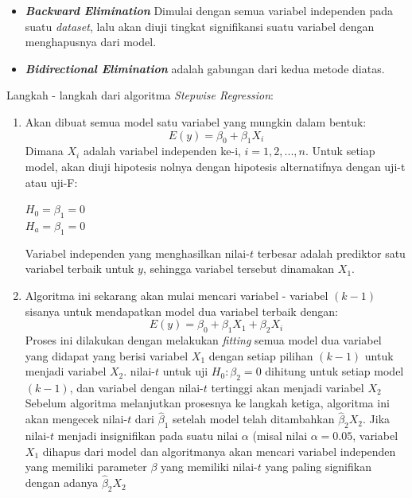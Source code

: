 \begin{enumerate}
\begin{itemize}
    \item \textit{\textbf{Backward Elimination}} Dimulai dengan semua variabel independen pada suatu \textit{dataset}, lalu akan diuji tingkat signifikansi suatu variabel dengan menghapusnya dari model.
    \item \textit{\textbf{Bidirectional Elimination}} adalah gabungan dari kedua metode diatas.
\end{itemize}
Langkah - langkah dari algoritma \textit{Stepwise Regression}:
\begin{enumerate}
    \item Akan dibuat semua model satu variabel yang mungkin dalam bentuk:
    \begin{equation*}
        E(y) = \beta_0 + \beta_1 X_i
    \end{equation*}
    Dimana $X_i$ adalah variabel independen ke-i, $i = 1, 2, ..., n$. Untuk setiap model, akan diuji hipotesis nolnya dengan hipotesis alternatifnya dengan uji-t atau uji-F:
    \begin{center}
        $H_0 = \beta_1 = 0$ \\
        $H_a = \beta_1 = 0$
    \end{center}
    Variabel independen yang menghasilkan nilai-$t$ terbesar adalah prediktor satu variabel terbaik untuk $y$, sehingga variabel tersebut dinamakan $X_1$.
    \item Algoritma ini sekarang akan mulai mencari variabel - variabel $(k - 1)$ sisanya untuk mendapatkan model dua variabel terbaik dengan:
    \begin{equation*}
        E(y) = \beta_0 + \beta_1 X_1 + \beta_2 X_i   
    \end{equation*}
    Proses ini dilakukan dengan melakukan \textit{fitting} semua model dua variabel yang didapat yang berisi variabel $X_1$ dengan setiap pilihan $(k - 1)$ untuk menjadi variabel $X_2$. nilai-$t$ untuk uji $H_0: \beta_2 = 0$ dihitung untuk setiap model $(k - 1)$, dan variabel dengan nilai-$t$ tertinggi akan menjadi variabel $X_2$ \\
    Sebelum algoritma melanjutkan prosesnya ke langkah ketiga, algoritma ini akan mengecek nilai-$t$ dari $
    \hat{\beta}_1$ setelah model telah ditambahkan $\hat{\beta}_2 X_2$. Jika nilai-$t$ menjadi insignifikan pada suatu nilai $\alpha$ (misal nilai $\alpha = 0.05$, variabel $X_1$ dihapus dari model dan algoritmanya akan mencari variabel independen yang memiliki parameter $\beta$ yang memiliki nilai-$t$ yang paling signifikan dengan adanya $\hat{\beta}_2 X_2$ \\

\end{enumerate}
\end{enumerate}
